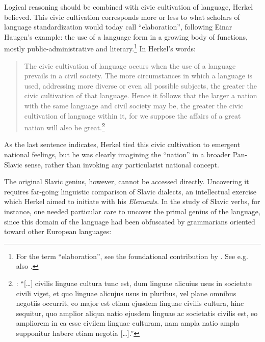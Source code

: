 \noindent Logical reasoning should be combined with civic cultivation of language, Her\-kel believed. This civic cultivation corresponds more or less to what scholars of language standardization would today call “elaboration”, following Einar Haugen’s example: the use of a language form in a growing body of functions, mostly public-administrative and literary.\footnote{For the term “elaboration”, see the foundational contribution by \citet{haugen_dialect_1966}. See e.g. also \citet{joseph_eloquence_1987}.} In Herkel’s words:

\begin{quote}
    The civic cultivation of language occurs when the use of a language prevails in a civil society. The more circumstances in which a language is used, addressing more diverse or even all possible subjects, the greater the civic cultivation of that language. Hence it follows that the larger a nation with the same language and civil society may be, the greater the civic cultivation of language within it, for we suppose the affairs of a great nation will also be great.\footnote{\citet[20]{herkel_elementa_1826}: “[…] civilis linguae cultura tunc est, dum linguae alicuius usus in societate civili viget, et quo linguae alicujus usus in pluribus, vel plane omnibus negotiis occurrit, eo major est etiam ejusdem linguae civilis cultura, hinc sequitur, quo amplior aliqua natio ejusdem linguae ac societatis civilis est, eo ampliorem in ea esse civilem linguae culturam, nam ampla natio ampla supponitur habere etiam negotia […].”}
\end{quote}

\noindent As the last sentence indicates, Herkel tied this civic cultivation to emergent national feelings, but he was clearly imagining the “nation” in a broader Pan-Slavic sense, rather than invoking any particularist national concept.

The original Slavic genius, however, cannot be accessed directly. Uncovering it requires far-going linguistic comparison of Slavic dialects, an intellectual exercise which Herkel aimed to initiate with his \textit{Elements}. In the study of Slavic verbs, for instance, one needed particular care to uncover the primal genius of the language, since this domain of the language had been obfuscated by grammarians oriented toward other European languages:

